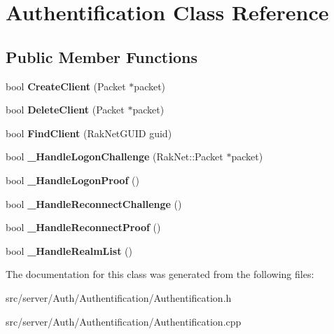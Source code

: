 \hypertarget{class_authentification}{\section{Authentification Class Reference}
\label{class_authentification}
}
\subsection*{Public Member Functions}
\begin{DoxyCompactItemize}
\item 
\hypertarget{class_authentification_a9cc153ac26a7a5e4c0dd56c2182ef7aa}{bool {\bfseries Create\-Client} (Packet $\ast$packet)}\label{class_authentification_a9cc153ac26a7a5e4c0dd56c2182ef7aa}

\item 
\hypertarget{class_authentification_a6734ee2fa780263443592cc2f02d918a}{bool {\bfseries Delete\-Client} (Packet $\ast$packet)}\label{class_authentification_a6734ee2fa780263443592cc2f02d918a}

\item 
\hypertarget{class_authentification_af1808489bd4c2e74507c549d5466f582}{bool {\bfseries Find\-Client} (Rak\-Net\-G\-U\-I\-D guid)}\label{class_authentification_af1808489bd4c2e74507c549d5466f582}

\item 
\hypertarget{class_authentification_ae1e5a8942e31c667d05ff94fd64e1236}{bool {\bfseries \-\_\-\-Handle\-Logon\-Challenge} (Rak\-Net\-::\-Packet $\ast$packet)}\label{class_authentification_ae1e5a8942e31c667d05ff94fd64e1236}

\item 
\hypertarget{class_authentification_a4749f3ed73e17a79a7e74a7f162fda49}{bool {\bfseries \-\_\-\-Handle\-Logon\-Proof} ()}\label{class_authentification_a4749f3ed73e17a79a7e74a7f162fda49}

\item 
\hypertarget{class_authentification_a409cdd1e3d0ce83c8834571918c6011d}{bool {\bfseries \-\_\-\-Handle\-Reconnect\-Challenge} ()}\label{class_authentification_a409cdd1e3d0ce83c8834571918c6011d}

\item 
\hypertarget{class_authentification_adfc637be23b0cf114e201b6275d71264}{bool {\bfseries \-\_\-\-Handle\-Reconnect\-Proof} ()}\label{class_authentification_adfc637be23b0cf114e201b6275d71264}

\item 
\hypertarget{class_authentification_a097485114d8bd1e9c36cd0c6b4a38a4a}{bool {\bfseries \-\_\-\-Handle\-Realm\-List} ()}\label{class_authentification_a097485114d8bd1e9c36cd0c6b4a38a4a}

\end{DoxyCompactItemize}


The documentation for this class was generated from the following files\-:\begin{DoxyCompactItemize}
\item 
src/server/\-Auth/\-Authentification/Authentification.\-h\item 
src/server/\-Auth/\-Authentification/Authentification.\-cpp\end{DoxyCompactItemize}
